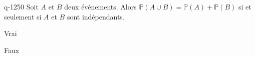 \begin{truefalse}{q-1250}
Soit $A$ et $B$ deux événements. Alors $\mathbb{P}(A\cup B)=\mathbb{P}(A)+\mathbb{P}(B)$ si et seulement si $A$ et $B$ sont indépendants.
\item Vrai
\item* Faux
\end{truefalse}

